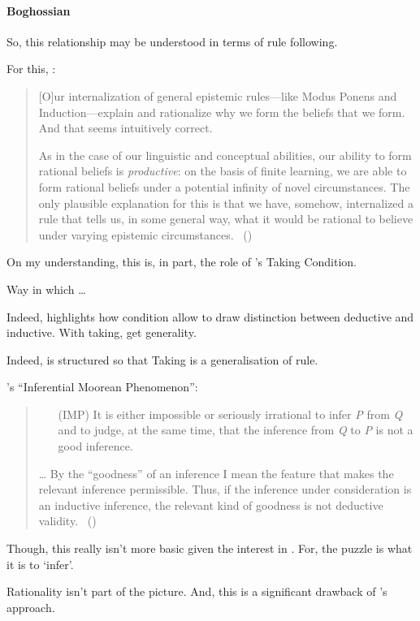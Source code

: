 \paragraph{Boghossian}

\begin{note}
  So, this relationship may be understood in terms of rule following.

  For this, \citeauthor{Boghossian:2008vf}:

  \begin{quote}
    [O]ur internalization of general epistemic rules---like Modus Ponens and Induction---explain and rationalize why we form the beliefs that we form.
    And that seems intuitively correct.

    As in the case of our linguistic and conceptual abilities, our ability to form rational beliefs is \emph{productive}: on the basis of finite learning, we are able to form rational beliefs under a potential infinity of novel circumstances.
    The only plausible explanation for this is that we have, somehow, internalized a rule that tells us, in some general way, what it would be rational to believe under varying epistemic circumstances.%
    \mbox{ }\hfill\mbox{(\citeyear[483]{Boghossian:2008vf})}
  \end{quote}
\end{note}

\begin{note}
  On my understanding, this is, in part, the role of \citeauthor{Boghossian:2014aa}'s Taking Condition.

  Way in which \dots

  Indeed, \citeauthor{Boghossian:2014aa} highlights how condition allow to draw distinction between deductive and inductive.
  With taking, get generality.

  Indeed, \textcite{Boghossian:2014aa} is structured so that Taking is a generalisation of rule.
\end{note}

\begin{note}
  \citeauthor{Hlobil:2014tq}'s ``Inferential Moorean Phenomenon'':
  \begin{quote}
    \begin{enumerate}
    \item[(IMP)]
      It is either impossible or seriously irrational to infer \emph{P} from \emph{Q} and to judge, at the same time, that the inference from \emph{Q} to \emph{P} is not a good inference.
    \end{enumerate}
    \dots
    By the ``goodness'' of an inference I mean the feature that makes the relevant inference permissible. Thus, if the inference under consideration is an inductive inference, the relevant kind of goodness is not deductive validity.%
    \mbox{ }\hfill\mbox{(\citeyear[\S1]{Hlobil:2014tq})}
  \end{quote}

  Though, this really isn't more basic given the interest in \sR{}.
  For, the puzzle is what it is to `infer'.

  Rationality isn't part of the picture.
  And, this is a significant drawback of \citeauthor{Hlobil:2014tq}'s approach.
\end{note}


